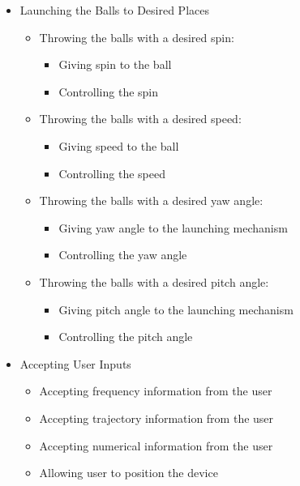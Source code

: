 \documentclass[12pt]{report}
\begin{document}
\begin{itemize}
    \item Launching the Balls to Desired Places
    \begin{itemize}
        \item Throwing the balls with a desired spin:
        \begin{itemize}
            \item Giving spin to the ball
            \item Controlling the spin
        \end{itemize}
        \item Throwing the balls with a desired speed:
        \begin{itemize}
            \item Giving speed to the ball
            \item Controlling the speed
        \end{itemize}
        \item Throwing the balls with a desired yaw angle:
        \begin{itemize}
            \item Giving yaw angle to the launching mechanism
            \item Controlling the yaw angle
        \end{itemize}
        \item Throwing the balls with a desired pitch angle:
        \begin{itemize}
            \item Giving pitch angle to the launching mechanism
            \item Controlling the pitch angle
        \end{itemize}
    \end{itemize}

    \item Accepting User Inputs
    \begin{itemize}
        \item Accepting frequency information from the user
        \item Accepting trajectory information from the user
        \item Accepting numerical information from the user
        \item Allowing user to position the device
    \end{itemize}


\end{itemize}
\end{document}
